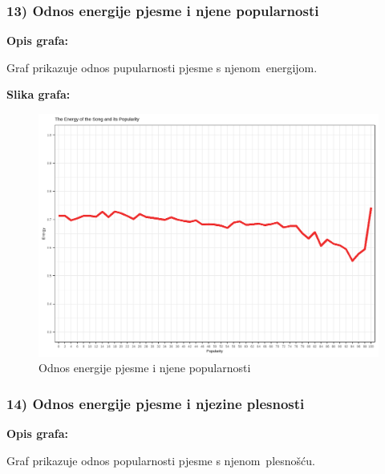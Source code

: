     \subsubsection{13) Odnos energije pjesme i njene popularnosti}
    
    \textbf{Opis grafa:}
    
    Graf prikazuje odnos pupularnosti pjesme s njenom energijom.
    
    
    \textbf{Slika grafa:}
    \begin{figure}[H]
    	\includegraphics[scale=0.9]{slike/energy_popularity.png}
    	\centering
    	\caption{Odnos energije pjesme i njene popularnosti}
    	
    \end{figure}
    
    \subsubsection{14) Odnos energije pjesme i njezine plesnosti}
    
    \textbf{Opis grafa:}
    
    Graf prikazuje odnos popularnosti pjesme s njenom plesnošću.
    
